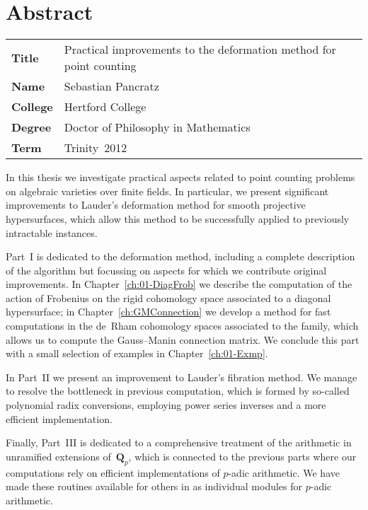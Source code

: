 \chapter*{Abstract}

\begin{tabular}{@{}ll@{}}
{\bfseries Title}   & Practical improvements to the deformation method for point counting \\
{\bfseries Name}    & Sebastian Pancratz \\
{\bfseries College} & Hertford College \\
{\bfseries Degree}  & Doctor of Philosophy in Mathematics \\
{\bfseries Term}    & Trinity~2012
\end{tabular}

\bigskip

\noindent
In this thesis we investigate practical aspects related 
to point counting problems on algebraic varieties over finite fields. 
In particular, we present significant improvements to Lauder's 
deformation method for smooth projective hypersurfaces, which 
allow this method to be successfully applied to previously 
intractable instances.

{Part~I} is dedicated to the deformation method, including a complete 
description of the algorithm but focussing on aspects for which we 
contribute original improvements.  In Chapter~\ref{ch:01-DiagFrob} 
we describe the computation of the action of Frobenius on the rigid 
cohomology space associated to a diagonal hypersurface; 
in Chapter~\ref{ch:GMConnection} we develop a method for fast 
computations in the de~Rham cohomology spaces associated to the family, 
which allows us to compute the Gauss--Manin connection matrix.  
We conclude this part with a small selection of examples in 
Chapter~\ref{ch:01-Exmp}.

In {Part~II} we present an improvement to Lauder's fibration method. 
We manage to resolve the bottleneck in previous computation, which is 
formed by so-called polynomial radix conversions, employing power 
series inverses and a more efficient implementation.

Finally, {Part~III} is dedicated to a comprehensive treatment of 
the arithmetic in unramified extensions of~$\mathbf{Q}_p$, which is 
connected to the previous parts where our computations rely on efficient 
implementations of $p$-adic arithmetic.  We have made these routines 
available for others in {} as individual modules for $p$-adic 
arithmetic.

